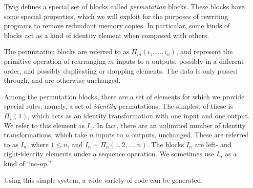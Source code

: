 Twig defines a special set of blocks called \emph{permutation} blocks. These
blocks have some special properties, which we will exploit for the purposes of
rewriting programs to remove redundant memory copies. In particular, some kinds
of blocks act as a kind of identity element when composed with others.

The permutation blocks are referred to as $\Pi_m(i_1,\ldots,i_n)$, and represent
the primitive operation of rearranging $m$ inputs to $n$ outputs, possibly in a
different order, and possibly duplicating or dropping elements. The data is only
passed through, and are otherwise unchanged.

Among the permutation blocks, there are a set of elements for which we provide
special rules; namely, a set of \emph{identity} permutations. The simplest of
these is $\Pi_1(1)$, which acts as an identity transformation with one input and
one output. We refer to this element as $I_1$. In fact, there are an unlimited
number of identity transformations, which take $n$ inputs to $n$ outputs,
unchanged. These are referred to as $I_n$, where $1 \leq n$, and $I_n =
\Pi_n(1,2,\ldots,n)$. The blocks $I_n$ are left- and right-identity elements
under a sequence operation. We sometimes use $I_n$ as a kind of ``no-op.''

Using this simple system, a wide variety of code can be generated.


